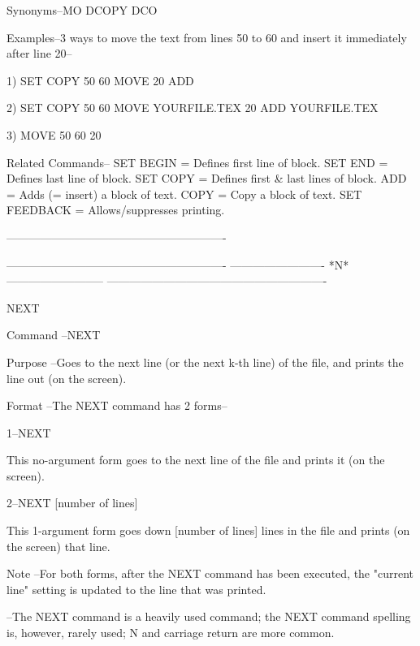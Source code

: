 Synonyms--MO
          DCOPY
          DCO
 
Examples--3 ways to move the text from
          lines 50 to 60 and insert it
          immediately after line 20--
 
          1) SET COPY   50 60
             MOVE
             20
             ADD
 
          2) SET COPY   50 60
             MOVE YOURFILE.TEX
             20
             ADD YOURFILE.TEX
 
          3) MOVE  50 60 20
 
Related Commands--
          SET BEGIN       = Defines first line of block.
          SET END         = Defines last line of block.
          SET COPY        = Defines first & last lines of block.
          ADD             = Adds (= insert) a block of text.
          COPY            = Copy a block of text.
          SET FEEDBACK    = Allows/suppresses printing.
 
----------------------------------------------------------
 
 
 
 
 
 
 
 
 
 
----------------------------------------------------------
-------------------------  *N*  --------------------------
----------------------------------------------------------
 
NEXT
 
Command --NEXT
 
Purpose --Goes to the next line (or the next
          k-th line) of the file, and
          prints the line out (on the screen).
 
Format  --The NEXT command has 2 forms--
 
       1--NEXT
 
          This no-argument form goes to the
          next line of the file and prints it
          (on the screen).
 
       2--NEXT     [number of lines]
 
          This 1-argument form goes down
          [number of lines] lines in the file and
          prints (on the screen) that line.
 
Note    --For both forms, after the NEXT command
          has been executed, the "current line"
          setting is updated to the line that
          was printed.
 
        --The NEXT command is a heavily used command;
          the NEXT command spelling is, however, rarely used;
          N    and    carriage return    are more common.
 
